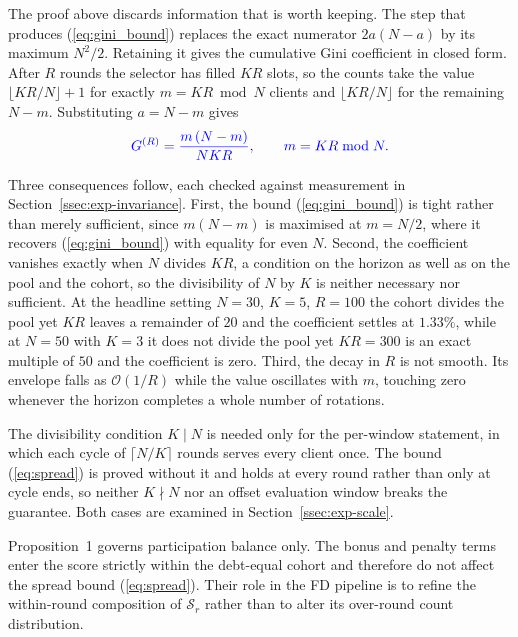 \documentclass[journal]{IEEEtran}
\newcommand{\rev}[1]{{\color{blue}#1}}
\begin{document}
\rev{The proof above discards information that is worth keeping. The step that produces (\ref{eq:gini_bound}) replaces the exact numerator $2a(N-a)$ by its maximum $N^2/2$. Retaining it gives the cumulative Gini coefficient in closed form. After $R$ rounds the selector has filled $KR$ slots, so the counts take the value $\lfloor KR/N \rfloor + 1$ for exactly $m = KR \bmod N$ clients and $\lfloor KR/N \rfloor$ for the remaining $N-m$. Substituting $a = N-m$ gives}
\begin{equation}
\rev{G^{(R)} = \frac{m\,(N-m)}{N K R}, \qquad m = KR \bmod N .}
\label{eq:gini_exact}
\end{equation}

\rev{Three consequences follow, each checked against measurement in Section~\ref{ssec:exp-invariance}. First, the bound (\ref{eq:gini_bound}) is tight rather than merely sufficient, since $m(N-m)$ is maximised at $m = N/2$, where it recovers (\ref{eq:gini_bound}) with equality for even $N$. Second, the coefficient vanishes exactly when $N$ divides $KR$, a condition on the horizon as well as on the pool and the cohort, so the divisibility of $N$ by $K$ is neither necessary nor sufficient. At the headline setting $N=30$, $K=5$, $R=100$ the cohort divides the pool yet $KR$ leaves a remainder of $20$ and the coefficient settles at $1.33\%$, while at $N=50$ with $K=3$ it does not divide the pool yet $KR = 300$ is an exact multiple of $50$ and the coefficient is zero. Third, the decay in $R$ is not smooth. Its envelope falls as $\mathcal{O}(1/R)$ while the value oscillates with $m$, touching zero whenever the horizon completes a whole number of rotations.}

\rev{The divisibility condition $K \mid N$ is needed only for the per-window statement, in which each cycle of $\lceil N/K \rceil$ rounds serves every client once. The bound (\ref{eq:spread}) is proved without it and holds at every round rather than only at cycle ends, so neither $K \nmid N$ nor an offset evaluation window breaks the guarantee. Both cases are examined in Section~\ref{ssec:exp-scale}.}

Proposition~1 governs participation balance only. The bonus and penalty terms enter the score strictly within the debt-equal cohort and therefore do not affect the spread bound (\ref{eq:spread}). Their role in the FD pipeline is to refine the within-round composition of $\mathcal{S}_r$ rather than to alter its over-round count distribution. %
\end{document}
